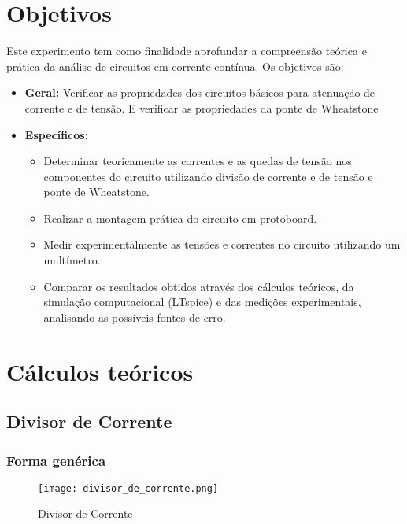 \documentclass[a4paper, 12pt]{article}
\begin{document}
\section{Objetivos}

Este experimento tem como finalidade aprofundar a compreensão teórica e prática da análise de circuitos em corrente contínua. Os objetivos são:

\begin{itemize}
\item \textbf{Geral:}  Verificar as propriedades dos circuitos básicos para atenuação de corrente e de
tensão. E verificar as propriedades da ponte de Wheatstone
\item \textbf{Específicos:}
\begin{itemize}
    \item Determinar teoricamente as correntes e as quedas de tensão nos componentes do circuito utilizando divisão de corrente e de tensão e ponte de Wheatstone.
    \item Realizar a montagem prática do circuito em protoboard.
    \item Medir experimentalmente as tensões e correntes no circuito utilizando um multímetro.
    \item Comparar os resultados obtidos através dos cálculos teóricos, da simulação computacional (LTspice) e das medições experimentais, analisando as possíveis fontes de erro.
\end{itemize}
\end{itemize}

\section{Cálculos teóricos}
\subsection{Divisor de Corrente}
\subsubsection{Forma genérica}

\begin{figure}[H]
\centering
\texttt{[image: divisor\_de\_corrente.png]}
\caption{Divisor de Corrente}
\label{fig:divisor_de_corrente}
\end{figure}
\end{document}
